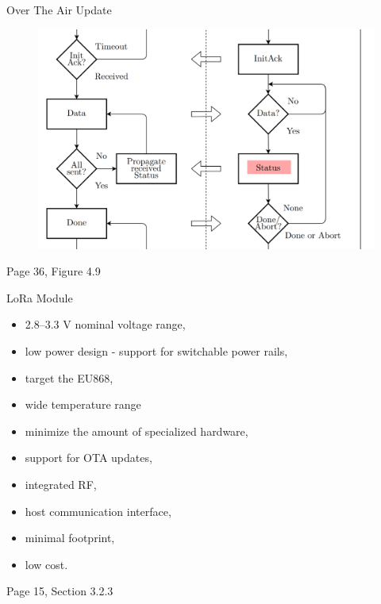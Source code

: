 \documentclass[hyphens]{beamer}
\newcommand{\backupend}{
   \addtocounter{framenumberappendix}{-\value{framenumber}}
   \addtocounter{framenumber}{\value{framenumberappendix}} 
}
\begin{document}
\begin{frame}{Over The Air Update}
\begin{figure}
    \centering
    \includegraphics[width=\linewidth]{img/ota.png}
\end{figure}
\begin{flushright}
    Page 36, Figure 4.9
\end{flushright}
\end{frame}


\begin{frame}{LoRa Module}
\begin{itemize}
    \item 2.8--3.3 V nominal voltage range,
    \item low power design - support for switchable power rails,
    \item target the EU868,
    \item wide temperature range
    \item minimize the amount of specialized hardware,
    \item support for OTA updates,
    \item integrated RF,
    \item host communication interface,
    \item minimal footprint,
    \item low cost.
\end{itemize}
\begin{flushright}
    Page 15, Section 3.2.3
\end{flushright}
\end{frame}

\backupend
\end{document}
